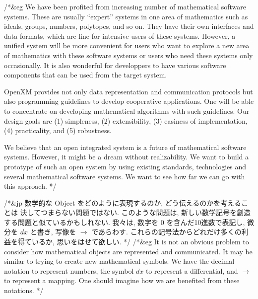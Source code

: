 /*&eg
We have been profited from increasing number
of mathematical software systems.
These are usually ``expert'' systems in one area of mathematics
such as ideals, groups, numbers, polytopes, and so on.
They have their own interfaces and data formats,
which are fine for intensive users of these systems.
However, a unified system will be more convenient
for users who want to explore a new area of mathematics with these
software systems or users who need these systems only occasionally.
It is also wonderful for developpers to have various software components
that can be used from the target system.
 
OpenXM provides not only data representation and communication protocols
but also programming guidelines to develop cooperative applications.
One will be able to concentrate on
developing mathematical algorithms with such guidelines.
Our design goals are (1) simpleness, (2) extensibility, (3) 
easiness of implementation, (4) practicality, and (5) robustness.

We believe that an open integrated system is a future of mathematical
software systems.  
However, it might be  a dream without realizability.
We want to build a prototype of such an open system by using existing
standards, technologies and several mathematical software systems.  
We want to see how far we can go with this approach.
*/

/*&jp
数学的な Object をどのように表現するのか, どう伝えるのかを考えることは
決してつまらない問題ではない.
このような問題は, 新しい数学記号を創造する問題と似ているかもしれない.
我々は, 数字を $0$ を含んだ10進数で表記し,
微分を $dx$ と書き, 写像を $ \longrightarrow $ であらわす.
これらの記号法からどれだけ多くの利益を得ているか, 思いをはせて欲しい.
*/
/*&eg
It is not an obvious problem to consider how mathematical objects
are represented and communicated.
It may be similar to trying to create new mathematical symbols.
We have the decimal notation to represent numbers, the symbol $dx$
to represent a differential, and $ \longrightarrow $ to represent
a mapping. One should imagine how we are benefited from these notations.
*/


